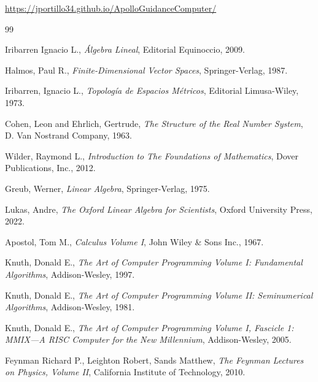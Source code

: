 \documentclass[12pt,openany]{book}
\theoremstyle{definition}
\begin{document}
\medskip

{\small
\url{https://jportillo34.github.io/ApolloGuidanceComputer/}
}

\clearpage

\makeatletter
\@mainmattertrue
\makeatother
{}






\backmatter
\clearpage
{}
{}

\begin{thebibliography}{99}

Iribarren Ignacio L., \textit{Álgebra Lineal}, Editorial Equinoccio, 2009.

Halmos, Paul R., \textit{Finite-Dimensional Vector Spaces}, Springer-Verlag, 1987.

Iribarren, Ignacio L., \textit{Topología de Espacios Métricos}, Editorial Limusa-Wiley, 1973.

Cohen, Leon and Ehrlich, Gertrude, \textit{The Structure of the Real Number System}, D. Van Nostrand Company, 1963.

Wilder, Raymond L., \textit{Introduction to The Foundations of Mathematics}, Dover Publications, Inc., 2012.

Greub, Werner, \textit{Linear Algebra}, Springer-Verlag, 1975.

Lukas, Andre, \textit{The Oxford Linear Algebra for Scientists}, Oxford University Press, 2022.

Apostol, Tom M., \textit{Calculus Volume I}, John Wiley \& Sons Inc., 1967.

Knuth, Donald E., \textit{The Art of Computer Programming Volume I: Fundamental Algorithms}, Addison-Wesley, 1997.

Knuth, Donald E., \textit{The Art of Computer Programming Volume II: Seminumerical Algorithms}, Addison-Wesley, 1981.

Knuth, Donald E., \textit{The Art of Computer Programming Volume I, Fascicle 1: MMIX—A RISC Computer for the New Millennium}, Addison-Wesley, 2005.

Feynman Richard P., Leighton Robert, Sands Matthew, \textit{The Feynman Lectures on Physics, Volume II}, California Institute of Technology, 2010.


\end{thebibliography}
\end{document}
